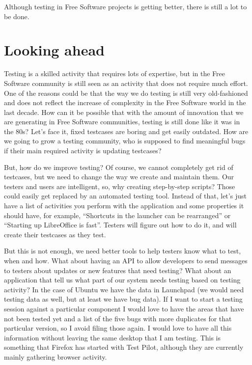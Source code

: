 Although testing in Free Software projects is getting better, there is still a lot to be
done.

\section*{Looking ahead}

Testing is a skilled activity that requires lots of expertise, but in the Free Software
community is still seen as an activity that does not require much effort. One of
the reasons could be that the way we do testing is still very old-fashioned and
does not reflect the increase of complexity in the Free Software world in the
last decade. How can it be possible that with the amount of innovation that we
are generating in Free Software communities, testing is still done like it was in
the 80s? Let's face it, fixed testcases are boring and get easily outdated. How
are we going to grow a testing community, who is supposed to find meaningful
bugs if their main required activity is updating testcases?

But, how do we improve testing? Of course, we cannot completely get rid of
testcases, but we need to change the way we create and maintain them. Our
testers and users are intelligent, so, why creating step-by-step scripts? Those
could easily get replaced by an automated testing tool. Instead of that, let's
just have a list of activities you perform with the application and some
properties it should have, for example, ``Shortcuts in the launcher can be
rearranged'' or ``Starting up LibreOffice is fast''. Testers will figure out how
to do it, and will create their testcases as they test.

But this is not enough, we need better tools to help testers know what to test,
when and how.  What about having an API to allow developers to send messages to
testers about updates or new features that need testing? What about an
application that tell us what part of our system needs testing based on testing
activity? In the case of Ubuntu we have the data in Launchpad (we would need
testing data as well, but at least we have bug data). If I want to start a
testing session against a particular component I would love to have the areas
that have not been tested yet and a list of the five bugs with more duplicates
for that particular version, so I avoid filing those again. I would love to have
all this information without leaving the same desktop that I am testing. This is
something that Firefox has started with Test Pilot, although they are currently
mainly gathering browser activity.

